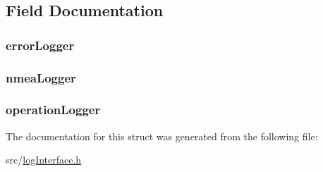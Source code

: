 \subsection{Field Documentation}
\subsubsection[{\texorpdfstring{error\+Logger}{errorLogger}}]{ error\+Logger}\hypertarget{struct_log___master_ad2f23f105d708487d58a08cfc0492d4a}{}\label{struct_log___master_ad2f23f105d708487d58a08cfc0492d4a}
\subsubsection[{\texorpdfstring{nmea\+Logger}{nmeaLogger}}]{ nmea\+Logger}\hypertarget{struct_log___master_a39b31051fe482d807aba1796b4b0591c}{}\label{struct_log___master_a39b31051fe482d807aba1796b4b0591c}
\subsubsection[{\texorpdfstring{operation\+Logger}{operationLogger}}]{ operation\+Logger}\hypertarget{struct_log___master_a86b17527dd6375131f69c50edcaa0d00}{}\label{struct_log___master_a86b17527dd6375131f69c50edcaa0d00}


The documentation for this struct was generated from the following file\+:\begin{DoxyCompactItemize}
\item 
src/\hyperlink{log_interface_8h}{log\+Interface.\+h}\end{DoxyCompactItemize}
